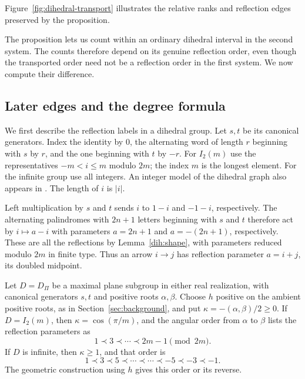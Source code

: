Figure~\ref{fig:dihedral-transport} illustrates the relative ranks and
reflection edges preserved by the proposition.


The proposition lets us count within an ordinary dihedral interval in the
second system. The counts therefore depend on its genuine reflection
order, even though the transported order need not be a reflection order
in the first system. We now compute their difference.

\subsection{Later edges and the degree formula}

We first describe the reflection labels in a dihedral group. Let $s,t$ be
its canonical generators. Index the identity by $0$, the alternating word
of length $r$ beginning with $s$ by $r$, and the one beginning with $t$ by
$-r$. For $I_2(m)$ use the representatives $-m<i\le m$ modulo $2m$;
the index $m$ is the longest element. For the infinite group use all
integers. An integer model of the dihedral graph also appears in
\cite[Section~1.10]{DyerRankTwo}. The length of $i$ is $|i|$.

Left multiplication by $s$ and $t$ sends $i$ to $1-i$ and $-1-i$,
respectively. The alternating palindromes with $2n+1$ letters beginning
with $s$ and $t$ therefore act by $i\mapsto a-i$ with parameters
$a=2n+1$ and $a=-(2n+1)$, respectively. These are all the reflections by
Lemma~\ref{dih:shape}, with parameters reduced modulo $2m$ in finite type.
Thus an arrow $i\to j$ has reflection parameter $a=i+j$, its doubled
midpoint.

\begin{lemma}\label{dih:midpoint-order}
Let $D=D_\Pi$ be a maximal plane subgroup in either real realization, with
canonical generators $s,t$ and positive roots $\alpha,\beta$. Choose $h$
positive on the ambient positive roots, as in Section~\ref{sec:background},
and put $\kappa=-(\alpha,\beta)/2\ge0$.
If $D=I_2(m)$, then $\kappa=\cos(\pi/m)$, and the angular order from
$\alpha$ to $\beta$ lists the reflection parameters as
\[
 1\prec3\prec\cdots\prec2m-1\pmod{2m}.
\]
If $D$ is infinite, then $\kappa\ge1$, and that order is
\[
 1\prec3\prec5\prec\cdots
 \prec\cdots\prec-5\prec-3\prec-1.
\]
The geometric construction using $h$ gives this order or its reverse.
\end{lemma}

